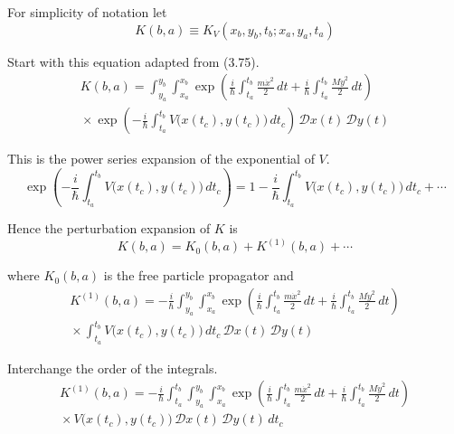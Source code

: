


For simplicity of notation let
\begin{equation*}
K(b,a)\equiv K_V(x_b,y_b,t_b;x_a,y_a,t_a)
\end{equation*}

Start with this equation adapted from (3.75).
\begin{multline*}
K(b,a)=\int_{y_a}^{y_b}\int_{x_a}^{x_b}
\exp\left(\frac{i}{\hbar}\int_{t_a}^{t_b}\frac{m\dot x^2}{2}\,dt
+\frac{i}{\hbar}\int_{t_a}^{t_b}\frac{M\dot y^2}{2}\,dt\right)
\\
{}\times\exp\left(-\frac{i}{\hbar}\int_{t_a}^{t_b}V\bigl(x(t_c),y(t_c)\bigr)\,dt_c\right)
\,\mathscr Dx(t)\,\mathscr Dy(t)
\end{multline*}

This is the power series expansion of the exponential of $V$.
\begin{equation*}
\exp\left(-\frac{i}{\hbar}\int_{t_a}^{t_b}V\bigl(x(t_c),y(t_c)\bigr)\,dt_c\right)
=1-\frac{i}{\hbar}\int_{t_a}^{t_b}V\bigl(x(t_c),y(t_c)\bigr)\,dt_c+{}\cdots
\end{equation*}

Hence the perturbation expansion of $K$ is
\begin{equation*}
K(b,a)=K_0(b,a)+K^{(1)}(b,a)+{}\cdots
\end{equation*}

where $K_0(b,a)$ is the free particle propagator and
\begin{multline*}
K^{(1)}(b,a)=-\frac{i}{\hbar}\int_{y_a}^{y_b}\int_{x_a}^{x_b}
\exp\left(\frac{i}{\hbar}\int_{t_a}^{t_b}\frac{m\dot x^2}{2}\,dt
+\frac{i}{\hbar}\int_{t_a}^{t_b}\frac{M\dot y^2}{2}\,dt\right)
\\
{}\times\int_{t_a}^{t_b}V\bigl(x(t_c),y(t_c)\bigr)
\,dt_c\,\mathscr Dx(t)\,\mathscr Dy(t)
\end{multline*}

Interchange the order of the integrals.
\begin{multline*}
K^{(1)}(b,a)=-\frac{i}{\hbar}\int_{t_a}^{t_b}\int_{y_a}^{y_b}\int_{x_a}^{x_b}
\exp\left(\frac{i}{\hbar}\int_{t_a}^{t_b}\frac{m\dot x^2}{2}\,dt
+\frac{i}{\hbar}\int_{t_a}^{t_b}\frac{M\dot y^2}{2}\,dt\right)
\\
{}\times V\bigl(x(t_c),y(t_c)\bigr)
\,\mathscr Dx(t)\,\mathscr Dy(t)\,dt_c
\end{multline*}

